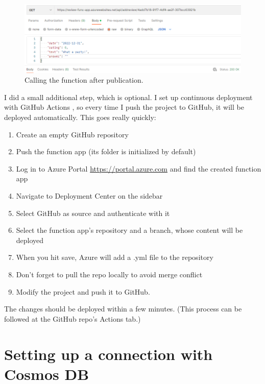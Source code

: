\begin{figure}[!ht]
	\centering
	\includegraphics[width=150mm, keepaspectratio]{figures/7_published_response.png}
	\caption{Calling the function after publication.}
	\label{fig:res_pub}
\end{figure}

I did a small additional step, which is optional. I set up continuous deployment with GitHub Actions \cite{GitHubActionsForFunctions}, so every time I push the project to GitHub, it will be deployed automatically. This goes really quickly:

\begin{enumerate}
	\item Create an empty GitHub repository 
	\item Push the function app (its folder is initialized by default)
	\item Log in to Azure Portal \url{https://portal.azure.com} and find the created function app
	\item Navigate to Deployment Center on the sidebar 
	\item Select GitHub as source and authenticate with it
	\item Select the function app's repository and a branch, whose content will be deployed
	\item When you hit save, Azure will add a .yml file to the repository
	\item Don't forget to pull the repo locally to avoid merge conflict
	\item Modify the project and push it to GitHub.
\end{enumerate}

The changes should be deployed within a few minutes. (This process can be followed at the GitHub repo's Actions tab.)

\section{Setting up a connection with Cosmos DB}


